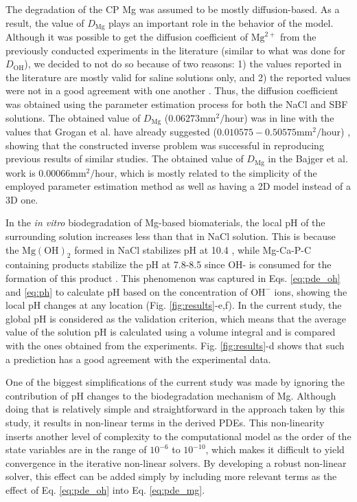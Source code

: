 The degradation of the CP Mg was assumed to be mostly diffusion-based. As a result, the value of $D_\mathrm{Mg}$ plays an important role in the behavior of the model. Although it was possible to get the diffusion coefficient of $\mathrm{Mg}^{2+}$ from the previously conducted experiments in the literature (similar to what was done for $D_\mathrm{OH}$), we decided to not do so because of two reasons: 1) the values reported in the literature are mostly valid for saline solutions only, and 2) the reported values were not in a good agreement with one another \cite{Grogan2014,Sun2012}. Thus, the diffusion coefficient was obtained using the parameter estimation process for both the NaCl and SBF solutions. The obtained value of $D_\mathrm{Mg}$ ($0.06273 \mathrm{mm}^2/\mathrm{hour}$) was in line with the values that Grogan et al. have already suggested ($0.010575-0.50575 \mathrm{mm}^2/\mathrm{hour}$) \cite{Grogan2014}, showing that the constructed inverse problem was successful in reproducing previous results of similar studies. The obtained value of $D_\mathrm{Mg}$ in the Bajger et al. work \cite{Bajger2016} is $0.00066\mathrm{mm}^2/\mathrm{hour}$, which is mostly related to the simplicity of the employed parameter estimation method as well as having a 2D model instead of a 3D one.


In the \textit{in vitro} biodegradation of Mg-based biomaterials, the local pH of the surrounding solution increases less than that in NaCl solution. This is because the $\mathrm{Mg(OH)}_2$ formed in NaCl stabilizes pH at 10.4 \cite{Santucci2018}, while Mg-Ca-P-C containing products stabilize the pH at 7.8-8.5 since OH- is consumed for the formation of this product \cite{Lamaka2018,Mei2019}. This phenomenon was captured in Eqs. \ref{eq:pde_oh} and \ref{eq:ph} to calculate pH based on the concentration of $\mathrm{OH}^{-}$ ions, showing the local pH changes at any location (Fig. \ref{fig:results}-e,f). In the current study, the global pH is considered as the validation criterion, which means that the average value of the solution pH is calculated using a volume integral and is compared with the ones obtained from the experiments. Fig. \ref{fig:results}-d shows that such a prediction has a good agreement with the experimental data.


One of the biggest simplifications of the current study was made by ignoring the contribution of pH changes to the biodegradation mechanism of Mg. Although doing that is relatively simple and straightforward in the approach taken by this study, it results in non-linear terms in the derived PDEs. This non-linearity inserts another level of complexity to the computational model as the order of the state variables are in the range of $10^{-6}$ to $10^{-10}$, which makes it difficult to yield convergence in the iterative non-linear solvers. By developing a robust non-linear solver, this effect can be added simply by including more relevant terms as the effect of Eq. \ref{eq:pde_oh} into Eq. \ref{eq:pde_mg}.

